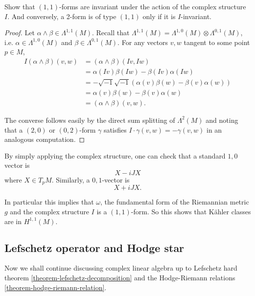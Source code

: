 \begin{exercise}
\label{exercise-1,1-forms-are-i-invariant}
Show that $(1,1)$-forms are invariant under
the action of
the complex structure $I$.
And conversely, a 2-form is of type $(1,1)$
only if it is $I$-invariant.
\end{exercise}

\begin{proof}
Let $\alpha\wedge\beta \in \Lambda^{1,1}(M)$.
Recall that
$\Lambda^{1,1}(M)=\Lambda^{1,0}(M)
\otimes\Lambda^{0,1}(M)$,
i.e. $\alpha \in \Lambda^{1,0}(M)$ and
$\beta \in \Lambda^{0,1}(M)$.
For any vectors $v,w$ tangent to some point
$p \in M$,
$$
\begin{aligned}
I(\alpha\wedge\beta)(v,w)
&=(\alpha\wedge\beta)(Iv,Iw)\\
&=\alpha(Iv)\beta(Iw)-\beta(Iv)\alpha(Iw)\\
&=-\sqrt{-1}\sqrt{-1}(\alpha(v)\beta(w)-
\beta(v)\alpha(w))\\
&=\alpha(v)\beta(w)-\beta(v)\alpha(w)\\
&=(\alpha\wedge\beta)(v,w).
\end{aligned}
$$

\noindent
The converse follows easily by the direct sum
splitting of $\Lambda^2(M)$ and noting that
a $(2,0)$ or $(0,2)$-form $\gamma$
satisfies $I\cdot\gamma(v,w)=-\gamma(v,w)$
in an analogous computation.
\end{proof}

\begin{remark}
\label{remark-1-0-vectors}
By simply applying the complex structure,
one can check that a standard $1,0$ vector
is
$$
X-i JX
$$
where $X \in T_p M$. Similarly, a
$0,1$-vector is
$$
X+i J X.
$$
 
\end{remark}

\noindent
In particular this implies that $\omega$,
the fundamental form of the Riemannian metric
$g$
and the complex structure $I$ is a
$(1,1)$-form.
So this shows that Kähler classes are in
$H^{1,1}(M)$.






\subsection{Lefschetz operator and Hodge
star}
\label{subsection-lefschetz-operator-hodge-star}

\noindent
Now we shall continue discussing complex
linear algebra up
to Lefschetz hard theorem
\ref{theorem-lefschetz-decomposition}
and the Hodge-Riemann relations
\ref{theorem-hodge-riemann-relation}.


